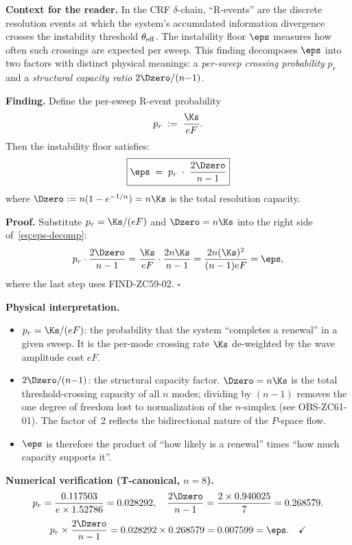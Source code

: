 \documentclass[12pt, a4paper]{article}
\begin{document}

\begin{derivedbox}[title={FIND-ZC61-01: Renewal Decomposition
  $\eps = p_r \cdot 2\Dzero/(n{-}1)$ ($R_0$, Exact)}]

\textbf{Context for the reader.}
In the CRF $\delta$-chain, ``R-events'' are the discrete
resolution events at which the system's accumulated information
divergence crosses the instability threshold $\theta_{\rm eff}$.
The instability floor $\eps$ measures how often such crossings
are expected per sweep.
This finding decomposes $\eps$ into two factors with distinct
physical meanings: a \emph{per-sweep crossing probability}
$p_r$ and a \emph{structural capacity ratio} $2\Dzero/(n{-}1)$.

\medskip
\textbf{Finding.}
Define the per-sweep R-event probability
\[
  p_r \;:=\; \frac{\Ks}{eF}.
\]
Then the instability floor satisfies:
\begin{equation}
  \boxed{\eps \;=\; p_r \;\cdot\; \frac{2\Dzero}{n-1}}
  \label{eq:eps-decomp}
\end{equation}
where $\Dzero := n(1-e^{-1/n}) = n\Ks$ is the total
resolution capacity.

\textbf{Proof.}
Substitute $p_r = \Ks/(eF)$ and $\Dzero = n\Ks$ into the
right side of~\eqref{eq:eps-decomp}:
\[
  p_r \cdot \frac{2\Dzero}{n-1}
  = \frac{\Ks}{eF} \cdot \frac{2n\Ks}{n-1}
  = \frac{2n(\Ks)^2}{(n-1)eF}
  = \eps,
\]
where the last step uses FIND-ZC59-02.
\hfill$\square$

\textbf{Physical interpretation.}
\begin{itemize}[leftmargin=2em, noitemsep]
  \item $p_r = \Ks/(eF)$: the probability that the system
    ``completes a renewal'' in a given sweep. It is the
    per-mode crossing rate $\Ks$ de-weighted by the
    wave amplitude cost $eF$.
  \item $2\Dzero/(n{-}1)$: the structural capacity factor.
    $\Dzero = n\Ks$ is the total threshold-crossing capacity
    of all $n$ modes; dividing by $(n{-}1)$ removes the
    one degree of freedom lost to normalization of the
    $n$-simplex (see OBS-ZC61-01).
    The factor of~2 reflects the bidirectional nature of
    the $P$-space flow.
  \item $\eps$ is therefore the product of ``how likely is
    a renewal'' times ``how much capacity supports it''.
\end{itemize}

\textbf{Numerical verification (T-canonical, $n=8$).}
\[
  p_r = \frac{0.117503}{e \times 1.52786}
      = 0.028292, \quad
  \frac{2\Dzero}{n-1} = \frac{2 \times 0.940025}{7}
      = 0.268579.
\]
\[
  p_r \times \frac{2\Dzero}{n-1}
  = 0.028292 \times 0.268579
  = 0.007599 = \eps. \quad\checkmark
\]


\end{derivedbox}
\end{document}
